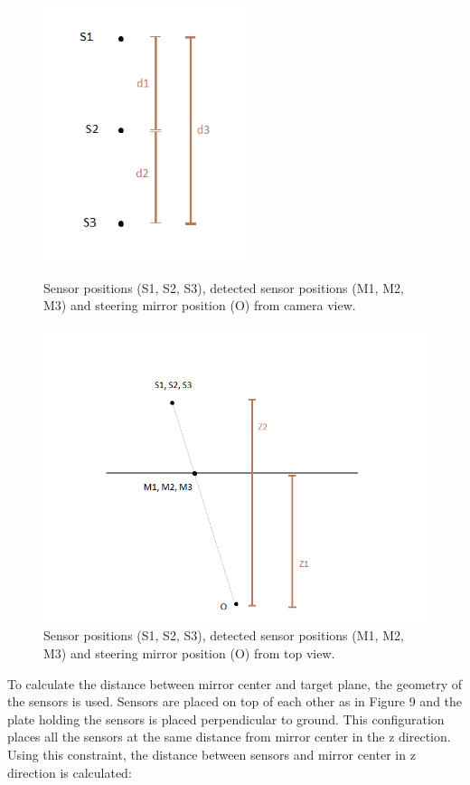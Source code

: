 \begin{figure}[!htb]\centering
    \includegraphics*[width = 6cm]{bilder/project/sensor_setup_camera.png}
    \caption{Sensor positions (S1, S2, S3), detected sensor positions (M1, M2, M3) and steering mirror position (O) from camera view.}
    \label{fig:sensor_geometry_camera}

    \includegraphics*[width = 16cm]{bilder/project/sensor_setup_top.png}
    \caption{Sensor positions (S1, S2, S3), detected sensor positions (M1, M2, M3) and steering mirror position (O) from top view.}
    \label{fig:sensor_geometry_top}
\end{figure}




To calculate the distance between mirror center and target plane, 
the geometry of the sensors is used. Sensors are placed on top 
of each other as in Figure 9 and the plate holding the sensors is 
placed perpendicular to ground. This configuration places all the 
sensors at the same distance from mirror center in the z direction. 
Using this constraint, the distance between sensors and mirror 
center in z direction is calculated: 

